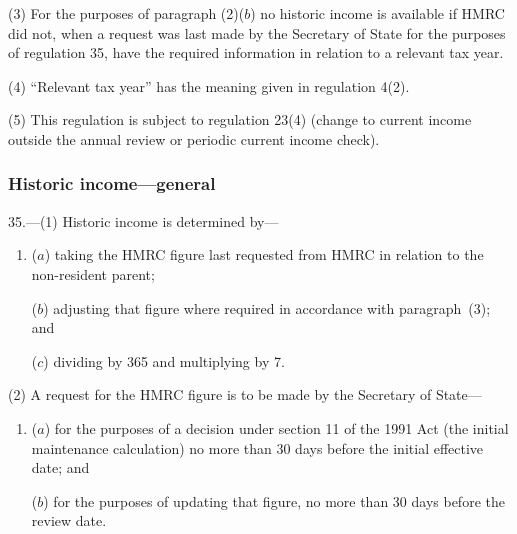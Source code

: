 \documentclass[12pt,a4paper]{article}
\begin{document}
%

(3) For the purposes of paragraph (2)($b$)  no historic income is available if HMRC did not, when a request was last made by the Secretary of State for the purposes of regulation 35, have the required information in relation to a relevant tax year.

(4) “Relevant tax year” has the meaning given in regulation 4(2).

(5) This regulation is subject to regulation 23(4) (change to current income outside the annual review or periodic current income check).


\subsubsection[35. Historic income---general]{Historic income---general}

35.---(1)  Historic income is determined by—
\begin{enumerate}\item[]
($a$) taking the HMRC figure last requested from HMRC in relation to the non-resident parent;

\begin{sloppypar}
($b$) adjusting that figure where required in accordance with paragraph~(3); and
\end{sloppypar}

($c$) dividing by 365 and multiplying by 7.
\end{enumerate}

(2) A request for the HMRC figure is to be made by the Secretary of State—
\begin{enumerate}\item[]
($a$) for the purposes of a decision under section 11 of the 1991 Act (the initial maintenance calculation) no more than 30 days before the initial effective date; and

($b$) for the purposes of updating that figure, no more than 30 days before the review date.
\end{enumerate}
\end{document}
